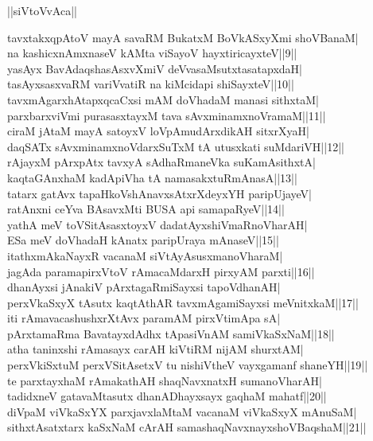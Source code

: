 \documentclass{article}
\begin{document}
\begin{center}
||siVtoVvAca||
\end{center}

tavxtakxqpAtoV mayA savaRM BukatxM BoVkASxyXmi shoVBanaM|\\
na kashicxnAmxnaseV kAMta viSayoV hayxtiricayxteV||9||\\
yasAyx BavAdaqshasAsxvXmiV deVvasaMsutxtasatapxdaH|\\
tasAyxsasxvaRM variVvatiR na kiMcidapi shiSayxteV||10||\\
tavxmAgarxhAtapxqcaCxsi mAM doVhadaM manasi sithxtaM|\\
parxbarxviVmi purasasxtayxM tava sAvxminamxnoVramaM||11||\\
ciraM jAtaM mayA satoyxV loVpAmudArxdikAH sitxrXyaH|\\
daqSATx sAvxminamxnoVdarxSuTxM tA utusxkati suMdariVH||12||\\
rAjayxM pArxpAtx tavxyA sAdhaRmaneVka suKamAsithxtA|\\
kaqtaGAnxhaM kadApiVha tA namasakxtuRmAnasA||13||\\
tatarx gatAvx tapaHkoVshAnavxsAtxrXdeyxYH paripUjayeV|\\
ratAnxni ceYva BAsavxMti BUSA api samapaRyeV||14||\\
yathA meV toVSitAsasxtoyxV dadatAyxshiVmaRnoVharAH|\\
ESa meV doVhadaH kAnatx paripUraya mAnaseV||15||\\
itathxmAkaNayxR vacanaM siVtAyAsusxmanoVharaM|\\
jagAda paramapirxVtoV rAmacaMdarxH pirxyAM parxti||16||\\
dhanAyxsi jAnakiV pArxtagaRmiSayxsi tapoVdhanAH|\\
perxVkaSxyX tAsutx kaqtAthAR tavxmAgamiSayxsi meVnitxkaM||17||\\
iti rAmavacashushxrXtAvx paramAM pirxVtimApa sA|\\
pArxtamaRma BavatayxdAdhx tApasiVnAM samiVkaSxNaM||18||\\
atha taninxshi rAmasayx carAH kiVtiRM nijAM shurxtAM|\\
perxVkiSxtuM perxVSitAsetxV tu nishiVtheV vayxgamanf shaneYH||19||\\
te parxtayxhaM rAmakathAH shaqNavxnatxH sumanoVharAH|\\
tadidxneV gatavaMtasutx dhanADhayxsayx gaqhaM mahatf||20||\\
diVpaM viVkaSxYX parxjavxlaMtaM vacanaM viVkaSxyX mAnuSaM|\\
sithxtAsatxtarx kaSxNaM cArAH samashaqNavxnayxshoVBaqshaM||21||\\
\end{document}
